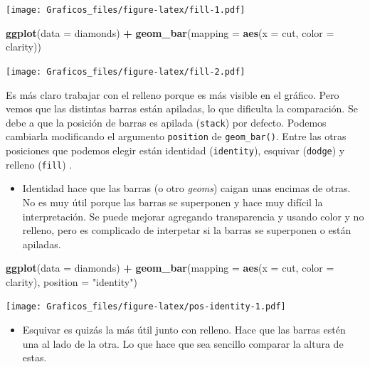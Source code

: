 \documentclass[]{book}
\newenvironment{Shaded}{\begin{snugshade}}{\end{snugshade}}
\newcommand{\DataTypeTok}[1]{\textcolor[rgb]{0.13,0.29,0.53}{#1}}
\newcommand{\KeywordTok}[1]{\textcolor[rgb]{0.13,0.29,0.53}{\textbf{#1}}}
\newcommand{\NormalTok}[1]{#1}
\newcommand{\OperatorTok}[1]{\textcolor[rgb]{0.81,0.36,0.00}{\textbf{#1}}}
\newcommand{\StringTok}[1]{\textcolor[rgb]{0.31,0.60,0.02}{#1}}
\providecommand{\tightlist}{%
  \setlength{\itemsep}{0pt}\setlength{\parskip}{0pt}}
\theoremstyle{definition}
\theoremstyle{definition}
\theoremstyle{definition}
\theoremstyle{remark}
\begin{document}
\texttt{[image: Graficos\_files/figure-latex/fill-1.pdf]}

\begin{Shaded}
\begin{Highlighting}[]
\KeywordTok{ggplot}\NormalTok{(}\DataTypeTok{data =}\NormalTok{ diamonds) }\OperatorTok{+}\StringTok{ }
\StringTok{  }\KeywordTok{geom_bar}\NormalTok{(}\DataTypeTok{mapping =} \KeywordTok{aes}\NormalTok{(}\DataTypeTok{x =}\NormalTok{ cut, }\DataTypeTok{color =}\NormalTok{ clarity))}
\end{Highlighting}
\end{Shaded}

\texttt{[image: Graficos\_files/figure-latex/fill-2.pdf]}

Es más claro trabajar con el relleno porque es más visible en el
gráfico. Pero vemos que las distintas barras están apiladas, lo que
dificulta la comparación. Se debe a que la posición de barras es apilada
(\texttt{stack}) por defecto. Podemos cambiarla modificando el argumento
\texttt{position} de \texttt{geom\_bar()}. Entre las otras posiciones
que podemos elegir están identidad (\texttt{identity}), esquivar
(\texttt{dodge}) y relleno (\texttt{fill}) .

\begin{itemize}
\tightlist
\item
  Identidad hace que las barras (o otro \emph{geoms}) caigan unas
  encimas de otras. No es muy útil porque las barras se superponen y
  hace muy difícil la interpretación. Se puede mejorar agregando
  transparencia y usando color y no relleno, pero es complicado de
  interpetar si la barras se superponen o están apiladas.
\end{itemize}

\begin{Shaded}
\begin{Highlighting}[]
\KeywordTok{ggplot}\NormalTok{(}\DataTypeTok{data =}\NormalTok{ diamonds) }\OperatorTok{+}\StringTok{ }
\StringTok{   }\KeywordTok{geom_bar}\NormalTok{(}\DataTypeTok{mapping =} \KeywordTok{aes}\NormalTok{(}\DataTypeTok{x =}\NormalTok{ cut, }\DataTypeTok{color =}\NormalTok{ clarity), }\DataTypeTok{position =} \StringTok{"identity"}\NormalTok{)}
\end{Highlighting}
\end{Shaded}

\texttt{[image: Graficos\_files/figure-latex/pos-identity-1.pdf]}

\begin{itemize}
\tightlist
\item
  Esquivar es quizás la más útil junto con relleno. Hace que las barras
  estén una al lado de la otra. Lo que hace que sea sencillo comparar la
  altura de estas.
\end{itemize}
\end{document}
